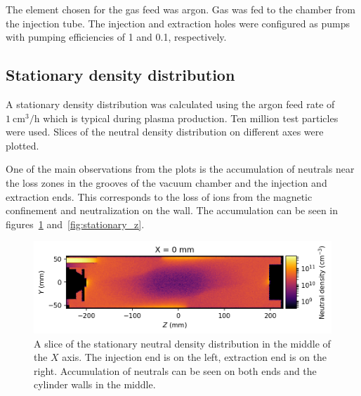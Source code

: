 \documentclass[a4paper,twoside,12pt]{article}
\begin{document}
The element chosen for the gas feed was argon. Gas was fed to the chamber from the injection tube. The injection and extraction holes were configured as pumps with pumping efficiencies of 1 and 0.1, respectively.

\subsection{Stationary density distribution}
A stationary density distribution was calculated using the argon feed rate of $\SI{1}{\centi\metre\cubed\per\hour}$ which is typical during plasma production. Ten million test particles were used. Slices of the neutral density distribution on different axes were plotted.

One of the main observations from the plots is the accumulation of neutrals near the loss zones in the grooves of the vacuum chamber and the injection and extraction ends. This corresponds to the loss of ions from the magnetic confinement and neutralization on the wall. The accumulation can be seen in figures~\ref{fig:stationary_x} and~\ref{fig:stationary_z}.

\begin{figure}
    \centering
    \includegraphics[width=\textwidth]{images/stationary_x_middle.png}
    \caption{A slice of the stationary neutral density distribution in the
    middle of the $X$ axis. The injection end is on the left, extraction end is
    on the right. Accumulation of neutrals can be seen on both ends and the
    cylinder walls in the middle.}
    \label{fig:stationary_x}
\end{figure}
\end{document}
